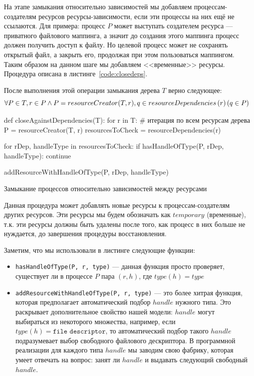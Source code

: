 На этапе замыкания относительно зависимостей мы добавляем процессам-создателям ресурсов ресурсы-зависимости, если эти процессы на них ещё не ссылаются. Для примера: процесс $P$ может выступать создателем ресурса --- приватного файлового маппинга, а значит до создания этого маппинга процесс должен получить доступ к файлу. Но целевой процесс может не сохранять открытый файл, а закрыть его, продолжая при этом пользоваться маппингом. Таким образом на данном шаге мы добавляем <<временные>> ресурсы. Процедура описана в листинге~\ref{code:closedeps}.

После выполнения этой операции замыкания дерева $T$ верно следующее:
\begin{equation*}
\forall P \in T, r \in P \land P = resourceCreator(T, r), q \in resourceDependencies\left( r \right) (q \in P)
\end{equation*} 

\begin{listing}[ht!]
\begin{pythoncode}
def closeAgainstDependencies(T):
    for r in T: # итерация по всем ресурсам дерева
        P = resourceCreator(T, r)
        resourcesToCheck = resourceDependencies(r)

        for rDep, handleType in resourcesToCheck:
            if hasHandleOfType(P, rDep, handleType):
                continue

            addResourceWithHandleOfType(P, rDep, handleType)
\end{pythoncode}
\caption{Замыкание процессов относительно зависимостей между ресурсами}
\label{code:closedeps}
\end{listing}

Данная процедура может добавлять новые ресурсы к процессам-создателям других ресурсов. Эти ресурсы мы будем обозначать как $temporary$ (временные), т.к. эти ресурсы должны быть удалены после того, как процесс в них больше не нуждается, до завершения процедуры восстановления.

Заметим, что мы использовали в листинге следующие функции:
\begin{itemize}
	\item \texttt{hasHandleOfType(P, r, type)} --- данная функция просто проверяет, существует ли в процессе $P$ пара $(r, h)$, где $type(h) = type$
	\item \texttt{addResourceWithHandleOfType(P, r, type)} --- это более хитрая функция, которая предполагает автоматический подбор $handle$ нужного типа. Это раскрывает дополнительное свойство нашей модели: $handle$ могут выбираться из некоторого множества, например, если $type(h) = \texttt{file descriptor}$, то автоматический подбор такого $handle$ подразумевает выбор свободного файлового дескриптора. В программной реализации для каждого типа $handle$ мы заводим свою фабрику, которая умеет отвечать на вопрос: занят ли $handle$ и выдавать следующий свободный $handle$.
\end{itemize}

